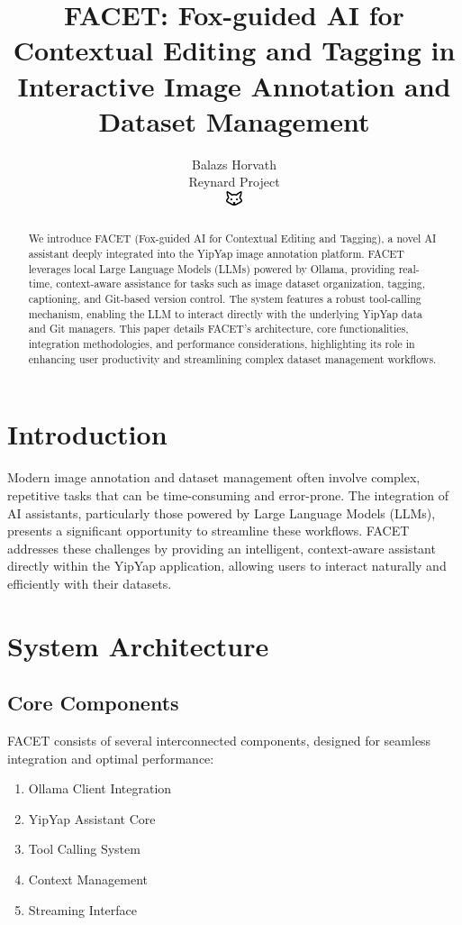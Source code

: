 \documentclass[10pt]{article}
\begin{document}
\title{FACET: Fox-guided AI for Contextual Editing and Tagging in Interactive Image Annotation and Dataset Management}

\author{Balazs Horvath\\
Reynard Project\\
\includegraphics[width=0.5cm]{../../shared-assets/favicon.pdf}}

\maketitle

\begin{abstract}
We introduce FACET (Fox-guided AI for Contextual Editing and Tagging), a novel AI assistant deeply integrated into the YipYap image annotation platform. FACET leverages local Large Language Models (LLMs) powered by Ollama, providing real-time, context-aware assistance for tasks such as image dataset organization, tagging, captioning, and Git-based version control. The system features a robust tool-calling mechanism, enabling the LLM to interact directly with the underlying YipYap data and Git managers. This paper details FACET's architecture, core functionalities, integration methodologies, and performance considerations, highlighting its role in enhancing user productivity and streamlining complex dataset management workflows.
\end{abstract}

\section{Introduction}
Modern image annotation and dataset management often involve complex, repetitive tasks that can be time-consuming and error-prone. The integration of AI assistants, particularly those powered by Large Language Models (LLMs), presents a significant opportunity to streamline these workflows. FACET addresses these challenges by providing an intelligent, context-aware assistant directly within the YipYap application, allowing users to interact naturally and efficiently with their datasets.

\section{System Architecture}
\subsection{Core Components}
FACET consists of several interconnected components, designed for seamless integration and optimal performance:
\begin{enumerate}
    \item Ollama Client Integration
    \item YipYap Assistant Core
    \item Tool Calling System
    \item Context Management
    \item Streaming Interface
\end{enumerate}
\end{document}
